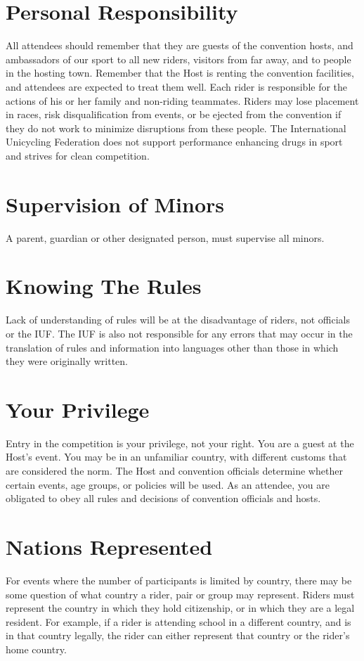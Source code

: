 \section{Personal Responsibility}
All attendees should remember that they are guests of the convention hosts, and ambassadors of our sport to all new riders, visitors from far away, and to people in the hosting town.
Remember that the Host is renting the convention facilities, and attendees are expected to treat them well.
Each rider is responsible for the actions of his or her family and non-riding teammates.
Riders may lose placement in races, risk disqualification from events, or be ejected from the convention if they do not work to minimize disruptions from these people.
The International Unicycling Federation does not support performance enhancing drugs in sport and strives for clean competition.

\section{Supervision of Minors}
A parent, guardian or other designated person, must supervise all minors.

\section{Knowing The Rules}
Lack of understanding of rules will be at the disadvantage of riders, not officials or the IUF.
The IUF is also not responsible for any errors that may occur in the translation of rules and information into languages other than those in which they were originally written.

\section{Your Privilege}
Entry in the competition is your privilege, not your right.
You are a guest at the Host's event.
You may be in an unfamiliar country, with different customs that are considered the norm.
The Host and convention officials determine whether certain events, age groups, or policies will be used.
As an attendee, you are obligated to obey all rules and decisions of convention officials and hosts.

\section{Nations Represented}
For events where the number of participants is limited by country, there may be some question of what country a rider, pair or group may represent.
Riders must represent the country in which they hold citizenship, or in which they are a legal resident.
For example, if a rider is attending school in a different country, and is in that country legally, the rider can either represent that country or the rider's home country.

